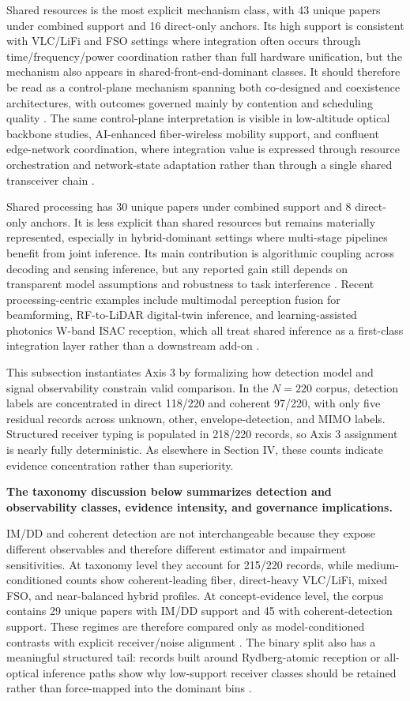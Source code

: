 \documentclass[letterpaper,journal]{IEEEtran}
\begin{document}
Shared resources is the most explicit mechanism class, with 43 unique papers under combined support and 16 direct-only anchors. Its high support is consistent with VLC/LiFi and FSO settings where integration often occurs through time/frequency/power coordination rather than full hardware unification, but the mechanism also appears in shared-front-end-dominant classes. It should therefore be read as a control-plane mechanism spanning both co-designed and coexistence architectures, with outcomes governed mainly by contention and scheduling quality .
The same control-plane interpretation is visible in low-altitude optical backbone studies, AI-enhanced fiber-wireless mobility support, and confluent edge-network coordination, where integration value is expressed through resource orchestration and network-state adaptation rather than through a single shared transceiver chain .

Shared processing has 30 unique papers under combined support and 8 direct-only anchors. It is less explicit than shared resources but remains materially represented, especially in hybrid-dominant settings where multi-stage pipelines benefit from joint inference. Its main contribution is algorithmic coupling across decoding and sensing inference, but any reported gain still depends on transparent model assumptions and robustness to task interference .
Recent processing-centric examples include multimodal perception fusion for beamforming, RF-to-LiDAR digital-twin inference, and learning-assisted photonics W-band ISAC reception, which all treat shared inference as a first-class integration layer rather than a downstream add-on .

This subsection instantiates Axis 3 by formalizing how detection model and signal observability constrain valid comparison. In the $N=220$ corpus, detection labels are concentrated in direct 118/220 and coherent 97/220, with only five residual records across unknown, other, envelope-detection, and MIMO labels. Structured receiver typing is populated in 218/220 records, so Axis 3 assignment is nearly fully deterministic. As elsewhere in Section IV, these counts indicate evidence concentration rather than superiority.

\textbf{The taxonomy discussion below summarizes detection and observability classes, evidence intensity, and governance implications.}

IM/DD and coherent detection are not interchangeable because they expose different observables and therefore different estimator and impairment sensitivities. At taxonomy level they account for 215/220 records, while medium-conditioned counts show coherent-leading fiber, direct-heavy VLC/LiFi, mixed FSO, and near-balanced hybrid profiles. At concept-evidence level, the corpus contains 29 unique papers with IM/DD support and 45 with coherent-detection support. These regimes are therefore compared only as model-conditioned contrasts with explicit receiver/noise alignment . The binary split also has a meaningful structured tail: records built around Rydberg-atomic reception or all-optical inference paths show why low-support receiver classes should be retained rather than force-mapped into the dominant bins .
\end{document}

